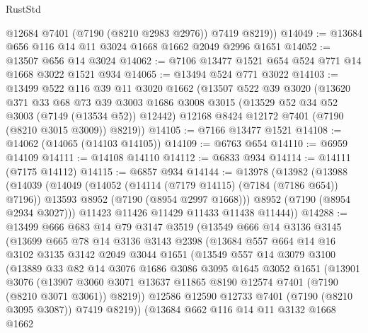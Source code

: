 \begin{lexlean}{RustStd}
\begin{coremodule}
        @12684
        @7401
        (@7190 (@8210 @2983 @2976))
        @7419
        @8219))
@14049 := @13684 @656 @116 @14 @11 @3024 @1668 @1662 @2049 @2996 @1651
@14052 := @13507 @656 @14 @3024
@14062 := @7106 @13477 @1521 @654 @524 @771 @14 @1668 @3022 @1521 @934
@14065 := @13494 @524 @771 @3022
@14103 := @13499
    @522
    @116
    @39
    @11
    @3020
    @1662
    (@13507
      @522
      @39
      @3020
      (@13620
        @371
        @33
        @68
        @73
        @39
        @3003
        @1686
        @3008
        @3015
        (@13529 @52 @34 @52 @3003 (@7149 (@13534 @52)) @12442)
        @12168
        @8424
        @12172
        @7401
        (@7190 (@8210 @3015 @3009))
        @8219))
@14105 := @7166 @13477 @1521
@14108 := @14062 (@14065 (@14103 @14105))
@14109 := @6763 @654
@14110 := @6959 @14109
@14111 := @14108 @14110
@14112 := @6833 @934
@14114 := @14111 (@7175 @14112)
@14115 := @6857 @934
@14144 := @13978
    (@13982
      (@13988
        (@14039
          (@14049
            (@14052 (@14114 (@7179 @14115) (@7184 (@7186 @654)) @7196))
            @13593
            @8952
            (@7190 (@8954 @2997 @1668)))
          @8952
          (@7190 (@8954 @2934 @3027)))
        @11423
        @11426
        @11429
        @11433
        @11438
        @11444))
@14288 := @13499
    @666
    @683
    @14
    @79
    @3147
    @3519
    (@13549
      @666
      @14
      @3136
      @3145
      (@13699
        @665
        @78
        @14
        @3136
        @3143
        @2398
        (@13684
          @557
          @664
          @14
          @16
          @3102
          @3135
          @3142
          @2049
          @3044
          @1651
          (@13549
            @557
            @14
            @3079
            @3100
            (@13889
              @33
              @82
              @14
              @3076
              @1686
              @3086
              @3095
              @1645
              @3052
              @1651
              (@13901
                @3076
                (@13907
                  @3060
                  @3071
                  @13637
                  @11865
                  @8190
                  @12574
                  @7401
                  (@7190 (@8210 @3071 @3061))
                  @8219))
              @12586
              @12590
              @12733
              @7401
              (@7190 (@8210 @3095 @3087))
              @7419
              @8219))
          (@13684
            @662
            @116
            @14
            @11
            @3132
            @1668
            @1662

\end{coremodule}
\end{lexlean}
